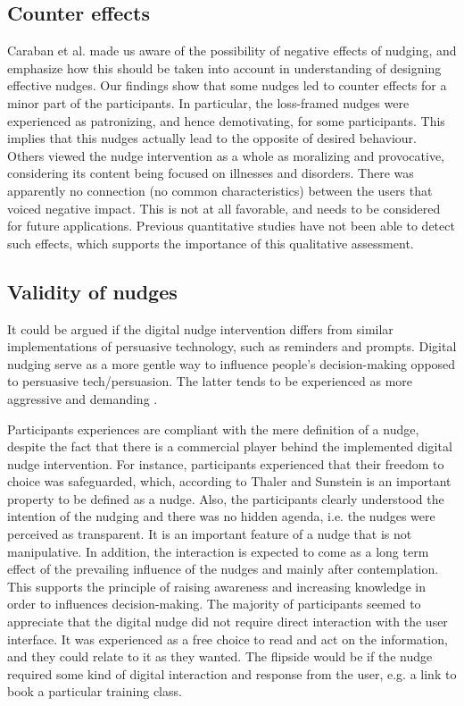 \subsection{Counter effects}
Caraban et al. \cite{caraban_23_2019} made us aware of the possibility of negative effects of nudging, and emphasize how this should be taken into account in understanding of designing effective nudges. Our findings show that some nudges led to counter effects for a minor part of the participants. In particular, the loss-framed nudges were experienced as patronizing, and hence demotivating, for some participants. This implies that this nudges actually lead to the opposite of desired behaviour. Others viewed the nudge intervention as a whole as moralizing and provocative, considering its content being focused on illnesses and disorders. There was apparently no connection (no common characteristics) between the users that voiced negative impact. This is not at all favorable, and needs to be considered for future applications. Previous quantitative studies have not been able to detect such effects, which supports the importance of this qualitative assessment.   

\subsection{Validity of nudges}
It could be argued if the digital nudge intervention differs from similar implementations of persuasive technology, such as reminders and prompts. Digital nudging serve as a more gentle way to influence people's decision-making opposed to persuasive tech/persuasion. The latter tends to be experienced as more aggressive and demanding \cite{meske_status_2019}. 

Participants experiences are compliant with the mere definition of a nudge, despite the fact that there is a commercial player behind the implemented digital nudge intervention. For instance, participants experienced that their freedom to choice was safeguarded, which, according to Thaler and Sunstein \cite{thaler_nudge-_2009} is an important property to be defined as a nudge. Also, the participants clearly understood the intention of the nudging and there was no hidden agenda, i.e. the nudges were perceived as transparent. It is an important feature of a nudge that is not manipulative\cite{karlsen_recommendations_2019}. In addition, the interaction is expected to come as a long term effect of the prevailing influence of the nudges and mainly after contemplation. This supports the principle of raising awareness and increasing knowledge in order to influences decision-making. The majority of participants seemed to appreciate that the digital nudge did not require direct interaction with the user interface. It was experienced as a free choice to read and act on the information, and they could relate to it as they wanted. The flipside would be if the nudge required some kind of digital interaction and response from the user, e.g. a link to book a particular training class.

